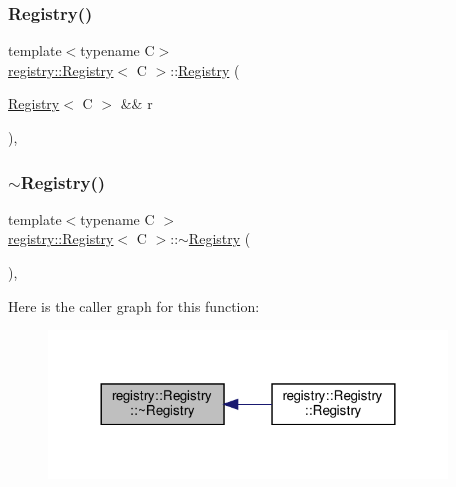 \mbox{\label{classregistry_1_1Registry_ae2d265e4cbbdda86f81c631ebb91f865}} 
\subsubsection{\texorpdfstring{Registry()}{Registry()}\hspace{0.1cm}{\footnotesize\ttfamily [4/5]}}
{\footnotesize\ttfamily template$<$typename C$>$ \\
\hyperlink{classregistry_1_1Registry}{registry\+::\+Registry}$<$ C $>$\+::\hyperlink{classregistry_1_1Registry}{Registry} (\begin{DoxyParamCaption}\item[{\hyperlink{classregistry_1_1Registry}{Registry}$<$ C $>$ \&\&}]{r }\end{DoxyParamCaption})\hspace{0.3cm}{\ttfamily [default]}, {\ttfamily [noexcept]}}

\mbox{\label{classregistry_1_1Registry_aea422f465bd0d2dba7e08f68b1dfc724}} 
\subsubsection{\texorpdfstring{$\sim$\+Registry()}{~Registry()}}
{\footnotesize\ttfamily template$<$typename C $>$ \\
\hyperlink{classregistry_1_1Registry}{registry\+::\+Registry}$<$ C $>$\+::$\sim$\hyperlink{classregistry_1_1Registry}{Registry} (\begin{DoxyParamCaption}{ }\end{DoxyParamCaption})\hspace{0.3cm}{\ttfamily [default]}, {\ttfamily [noexcept]}}

Here is the caller graph for this function\+:\nopagebreak
\begin{figure}[H]
\begin{center}
\leavevmode
\includegraphics[width=300pt]{classregistry_1_1Registry_aea422f465bd0d2dba7e08f68b1dfc724_icgraph}
\end{center}
\end{figure}
\mbox{\label{classregistry_1_1Registry_a8e577f4054494ec562dcb84f99a613b0}} 
